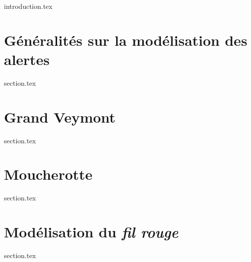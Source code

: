 
\chaptertoc{}

{introduction.tex}

\section{Généralités sur la modélisation des alertes}
\label{sec:9-1}
{section.tex}

\section{Grand Veymont}
\label{sec:9-2}
{section.tex}

\section{Moucherotte}
\label{sec:9-3}
{section.tex}

\section{Modélisation du \emph{fil rouge}}
\label{sec:9-4}
{section.tex}



